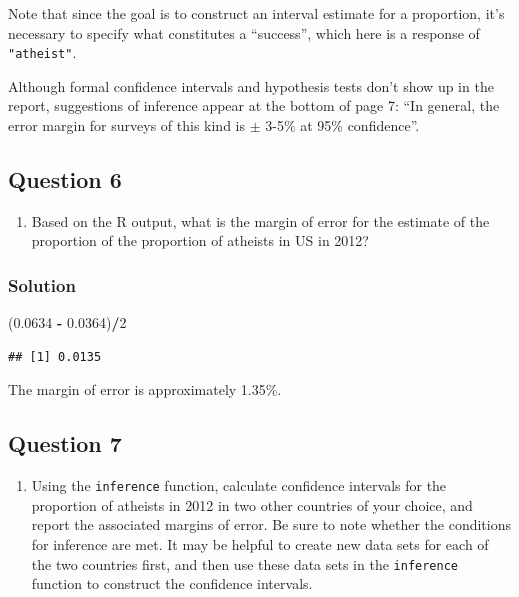 \documentclass[]{article}
\newenvironment{Shaded}{\begin{snugshade}}{\end{snugshade}}
\newcommand{\DecValTok}[1]{\textcolor[rgb]{0.00,0.00,0.81}{#1}}
\newcommand{\FloatTok}[1]{\textcolor[rgb]{0.00,0.00,0.81}{#1}}
\newcommand{\StringTok}[1]{\textcolor[rgb]{0.31,0.60,0.02}{#1}}
\newcommand{\OperatorTok}[1]{\textcolor[rgb]{0.81,0.36,0.00}{\textbf{#1}}}
\newcommand{\NormalTok}[1]{#1}
\providecommand{\tightlist}{%
  \setlength{\itemsep}{0pt}\setlength{\parskip}{0pt}}
\begin{document}
Note that since the goal is to construct an interval estimate for a
proportion, it's necessary to specify what constitutes a ``success'',
which here is a response of \texttt{"atheist"}.

Although formal confidence intervals and hypothesis tests don't show up
in the report, suggestions of inference appear at the bottom of page 7:
``In general, the error margin for surveys of this kind is \(\pm\) 3-5\%
at 95\% confidence''.

\subsection{Question 6}\label{question-6}

\begin{enumerate}
\def\labelenumi{\arabic{enumi}.}
\setcounter{enumi}{5}
\tightlist
\item
  Based on the R output, what is the margin of error for the estimate of
  the proportion of the proportion of atheists in US in 2012?
\end{enumerate}

\subsubsection{Solution}\label{solution-5}

\begin{Shaded}
\begin{Highlighting}[]
\NormalTok{(}\FloatTok{0.0634} \OperatorTok{-}\StringTok{ }\FloatTok{0.0364}\NormalTok{)}\OperatorTok{/}\DecValTok{2}
\end{Highlighting}
\end{Shaded}

\begin{verbatim}
## [1] 0.0135
\end{verbatim}

The margin of error is approximately 1.35\%.

\subsection{Question 7}\label{question-7}

\begin{enumerate}
\def\labelenumi{\arabic{enumi}.}
\setcounter{enumi}{6}
\tightlist
\item
  Using the \texttt{inference} function, calculate confidence intervals
  for the proportion of atheists in 2012 in two other countries of your
  choice, and report the associated margins of error. Be sure to note
  whether the conditions for inference are met. It may be helpful to
  create new data sets for each of the two countries first, and then use
  these data sets in the \texttt{inference} function to construct the
  confidence intervals.
\end{enumerate}
\end{document}
